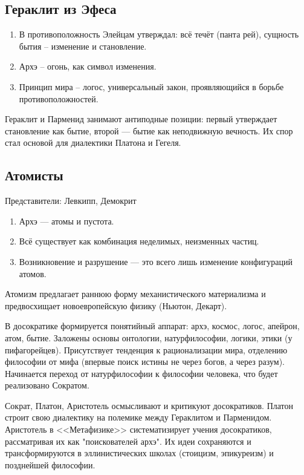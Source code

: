 \documentclass[12pt,a4paper]{article}
\begin{document}
	\subsection{Гераклит из Эфеса}
	\begin{enumerate}
		\item В противоположность Элейцам утверждал: всё течёт (панта рей), сущность бытия -- изменение и становление.
		
		\item Архэ -- огонь, как символ изменения.
		
		\item Принцип мира -- логос, универсальный закон, проявляющийся в борьбе противоположностей.
	\end{enumerate}
	Гераклит и Парменид занимают антиподные позиции: первый утверждает становление как бытие, второй — бытие как неподвижную вечность. Их спор стал основой для диалектики Платона и Гегеля.
	
	\subsection{Атомисты}
	Представители: Левкипп, Демокрит
	\begin{enumerate}
		\item Архэ — атомы и пустота.
		
		\item Всё существует как комбинация неделимых, неизменных частиц.
		
		\item Возникновение и разрушение — это всего лишь изменение конфигураций атомов.
	\end{enumerate}
	Атомизм предлагает раннюю форму механистического материализма и предвосхищает новоевропейскую физику (Ньютон, Декарт).
	
	В досократике формируется понятийный аппарат: архэ, космос, логос, апейрон, атом, бытие. Заложены основы онтологии, натурфилософии, логики, этики (у пифагорейцев). Присутствует тенденция к рационализации мира, отделению философии от мифа (впервые поиск истины не через богов, а через разум). Начинается переход от натурфилософии к философии человека, что будет реализовано Сократом.
	
	\par Сократ, Платон, Аристотель осмысливают и критикуют досократиков.
	Платон строит свою диалектику на полемике между Гераклитом и Парменидом.
	Аристотель в <<Метафизике>> систематизирует учения досократиков, рассматривая их как "поискователей архэ".
	Их идеи сохраняются и трансформируются в эллинистических школах (стоицизм, эпикуреизм) и позднейшей философии.
	
\end{document}
